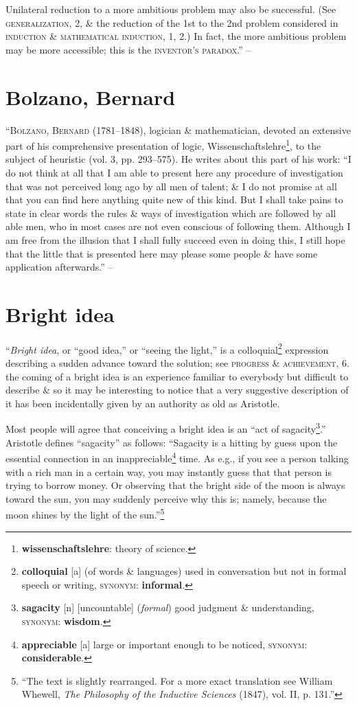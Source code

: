 \documentclass[oneside]{book}
\numberwithin{equation}{section}
\begin{document}
Unilateral reduction to a more ambitious problem may also be successful. (See \textsc{generalization}, 2, \& the reduction of the 1st to the 2nd problem considered in \textsc{induction \& mathematical induction}, 1, 2.) In fact, the more ambitious problem may be more accessible; this is the \textsc{inventor's paradox}.'' -- \cite[pp. 50--57]{Polya2014}

\section{Bolzano, Bernard}
``\textsc{Bolzano, Bernard} (1781--1848), logician \& mathematician, devoted an extensive part of his comprehensive presentation of logic, Wissenschaftslehre\footnote{\textbf{wissenschaftslehre}: theory of science.}, to the subject of heuristic (vol. 3, pp. 293--575). He writes about this part of his work: ``I do not think at all that I am able to present here any procedure of investigation that was not perceived long ago by all men of talent; \& I do not promise at all that you can find here anything quite new of this kind. But I shall take pains to state in clear words the rules \& ways of investigation which are followed by all able men, who in most cases are not even conscious of following them. Although I am free from the illusion that I shall fully succeed even in doing this, I still hope that the little that is presented here may please some people \& have some application afterwards.'' -- \cite[pp. 57--58]{Polya2014}

\section{Bright idea}
``\textit{Bright idea}, or ``good idea,'' or ``seeing the light,'' is a colloquial\footnote{\textbf{colloquial} [a] (of words \& languages) used in conversation but not in formal speech or writing, \textsc{synonym}: \textbf{informal}.} expression describing a sudden advance toward the solution; see \textsc{progress \& achievement}, 6. the coming of a bright idea is an experience familiar to everybody but difficult to describe \& so it may be interesting to notice that a very suggestive description of it has been incidentally given by an authority as old as Aristotle.

Most people will agree that conceiving a bright idea is an ``act of sagacity\footnote{\textbf{sagacity} [n] [uncountable] (\textit{formal}) good judgment \& understanding, \textsc{synonym}: \textbf{wisdom}.}.'' Aristotle defines ``sagacity'' as follows: ``Sagacity is a hitting by guess upon the essential connection in an inappreciable\footnote{\textbf{appreciable} [a] large or important enough to be noticed, \textsc{synonym}: \textbf{considerable}.} time. As e.g., if you see a person talking with a rich man in a certain way, you may instantly guess that that person is trying to borrow money. Or observing that the bright side of the moon is always toward the sun, you may suddenly perceive why this is; namely, because the moon shines by the light of the sun.''\footnote{``The text is slightly rearranged. For a more exact translation see William Whewell, \textit{The Philosophy of the Inductive Sciences} (1847), vol. II, p. 131.''}
\end{document}
